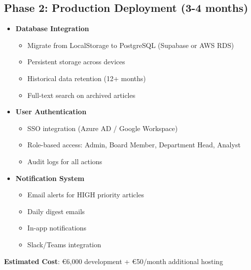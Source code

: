 \documentclass[11pt,a4paper]{article}
\begin{document}
\subsection{Phase 2: Production Deployment (3-4 months)}
\begin{itemize}[leftmargin=*]
    \item \textbf{Database Integration}
    \begin{itemize}
        \item Migrate from LocalStorage to PostgreSQL (Supabase or AWS RDS)
        \item Persistent storage across devices
        \item Historical data retention (12+ months)
        \item Full-text search on archived articles
    \end{itemize}
    
    \item \textbf{User Authentication}
    \begin{itemize}
        \item SSO integration (Azure AD / Google Workspace)
        \item Role-based access: Admin, Board Member, Department Head, Analyst
        \item Audit logs for all actions
    \end{itemize}
    
    \item \textbf{Notification System}
    \begin{itemize}
        \item Email alerts for HIGH priority articles
        \item Daily digest emails
        \item In-app notifications
        \item Slack/Teams integration
    \end{itemize}
\end{itemize}

\textbf{Estimated Cost}: \euro 6,000 development + \euro 50/month additional hosting
\end{document}
